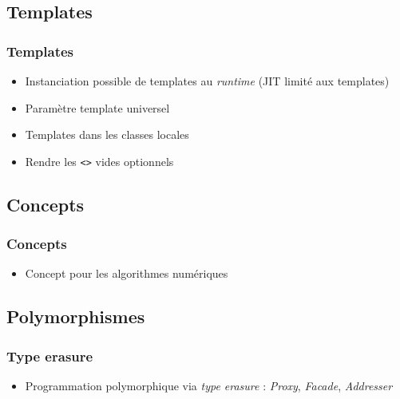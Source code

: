 \documentclass[C++.tex]{subfiles}
\begin{document}
\subsection*{Templates}
\begin{frame}[fragile]
	\frametitle{Templates}
	\begin{itemize}
		\item Instanciation possible de templates au \textit{runtime} (JIT limité aux templates)


		\item Paramètre template universel


		\item Templates dans les classes locales
		\item Rendre les \lstinline|<>| vides optionnels
	\end{itemize}
\end{frame}

\subsection*{Concepts}
\begin{frame}[fragile]
	\frametitle{Concepts}
	\begin{itemize}
		\item Concept pour les algorithmes numériques
	\end{itemize}
\end{frame}

\subsection*{Polymorphismes}
\begin{frame}[fragile]
	\frametitle{Type erasure}
	\begin{itemize}
		\item Programmation polymorphique via \textit{type erasure} : \textit{Proxy}, \textit{Facade}, \textit{Addresser}

	\end{itemize}
\end{frame}
\end{document}
